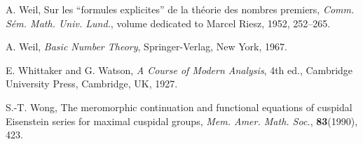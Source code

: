 \begin{enumerate}[label={[\arabic*]},leftmargin=2.8em,itemsep=0.35em,topsep=0.4em]
\item A. Weil, Sur les ``formules explicites'' de la th\'eorie des nombres premiers,
\emph{Comm. S\'em. Math. Univ. Lund.}, volume dedicated to Marcel Riesz, 1952,
252--265.
\item A. Weil, \emph{Basic Number Theory}, Springer-Verlag, New York, 1967.
\item E. Whittaker and G. Watson, \emph{A Course of Modern Analysis}, 4th ed.,
Cambridge University Press, Cambridge, UK, 1927.
\item S.-T. Wong, The meromorphic continuation and functional equations of cuspidal
Eisenstein series for maximal cuspidal groups, \emph{Mem. Amer. Math. Soc.},
\textbf{83}(1990), 423.
\end{enumerate}
